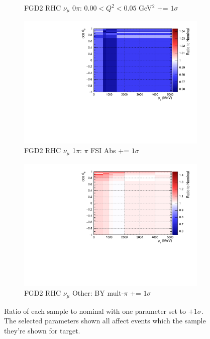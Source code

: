 \begin{figure}
\begin{subfigure}{.32\textwidth}
  \caption{FGD2 RHC $\nu_{\mu}$ 0$\pi$: $0.00 < Q^2 < 0.05$ GeV$^2$ += $1\sigma$}
  \label{fig:sigvar_FGD2_NuMuBkg_CC0pi_in_AntiNu_Mode}
\end{subfigure}
\begin{subfigure}{.32\textwidth}
  \centering
  \includegraphics[width=0.85\linewidth]{figs/sig/FGD2_NuMuBkg_CC1pi_in_AntiNu_Mode_FEFABS_+1sig.pdf}
  \caption{FGD2 RHC $\nu_{\mu}$ 1$\pi$: $\pi$ FSI Abs += $1\sigma$}
  \label{fig:sigvar_FGD2_NuMuBkg_CC1pi_in_AntiNu_Mode}
\end{subfigure}
\begin{subfigure}{.32\textwidth}
  \centering
  \includegraphics[width=0.85\linewidth]{figs/sig/FGD2_NuMuBkg_CCOther_in_AntiNu_Mode_CC_BY_MPi_+1sig.pdf}
  \caption{FGD2 RHC $\nu_{\mu}$ Other: BY mult-$\pi$ += $1\sigma$}
  \label{fig:sigvar_FGD2_NuMuBkg_CCOther_in_AntiNu_Mode}
\end{subfigure}
\caption{Ratio of each sample to nominal with one parameter set to $+1\sigma$. The  selected parameters shown all affect events which the sample they're shown for target.}
\label{fig:sigvars}
\end{figure}

